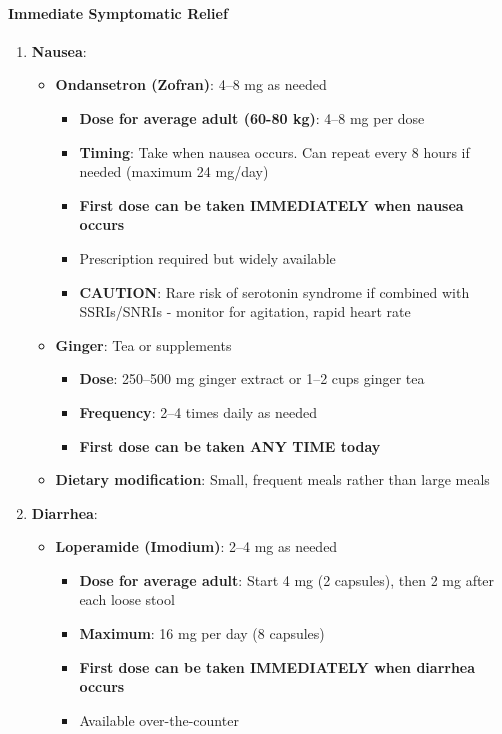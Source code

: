 \paragraph{Immediate Symptomatic Relief}

\begin{enumerate}
    \item \textbf{Nausea}:
    \begin{itemize}
        \item \textbf{Ondansetron (Zofran)}: 4--8 mg as needed
        \begin{itemize}
            \item \textbf{Dose for average adult (60-80 kg)}: 4--8 mg per dose
            \item \textbf{Timing}: Take when nausea occurs. Can repeat every 8 hours if needed (maximum 24 mg/day)
            \item \textbf{First dose can be taken IMMEDIATELY when nausea occurs}
            \item Prescription required but widely available
            \item \textbf{CAUTION}: Rare risk of serotonin syndrome if combined with SSRIs/SNRIs - monitor for agitation, rapid heart rate
        \end{itemize}

        \item \textbf{Ginger}: Tea or supplements
        \begin{itemize}
            \item \textbf{Dose}: 250--500 mg ginger extract or 1--2 cups ginger tea
            \item \textbf{Frequency}: 2--4 times daily as needed
            \item \textbf{First dose can be taken ANY TIME today}
        \end{itemize}

        \item \textbf{Dietary modification}: Small, frequent meals rather than large meals
    \end{itemize}

    \item \textbf{Diarrhea}:
    \begin{itemize}
        \item \textbf{Loperamide (Imodium)}: 2--4 mg as needed
        \begin{itemize}
            \item \textbf{Dose for average adult}: Start 4 mg (2 capsules), then 2 mg after each loose stool
            \item \textbf{Maximum}: 16 mg per day (8 capsules)
            \item \textbf{First dose can be taken IMMEDIATELY when diarrhea occurs}
            \item Available over-the-counter
        \end{itemize}


\end{itemize}
\end{enumerate}
